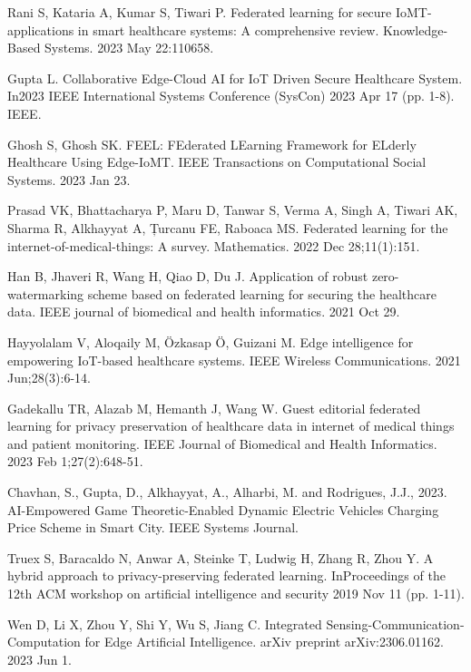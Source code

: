\documentclass[conference]{IEEEtran}
\begin{document}
\begin{thebibliography}{1}
Rani S, Kataria A, Kumar S, Tiwari P. Federated learning for secure IoMT-applications in smart healthcare systems: A comprehensive review. Knowledge-Based Systems. 2023 May 22:110658.

Gupta L. Collaborative Edge-Cloud AI for IoT Driven Secure Healthcare System. In2023 IEEE International Systems Conference (SysCon) 2023 Apr 17 (pp. 1-8). IEEE.

Ghosh S, Ghosh SK. FEEL: FEderated LEarning Framework for ELderly Healthcare Using Edge-IoMT. IEEE Transactions on Computational Social Systems. 2023 Jan 23.

Prasad VK, Bhattacharya P, Maru D, Tanwar S, Verma A, Singh A, Tiwari AK, Sharma R, Alkhayyat A, Țurcanu FE, Raboaca MS. Federated learning for the internet-of-medical-things: A survey. Mathematics. 2022 Dec 28;11(1):151.

Han B, Jhaveri R, Wang H, Qiao D, Du J. Application of robust zero-watermarking scheme based on federated learning for securing the healthcare data. IEEE journal of biomedical and health informatics. 2021 Oct 29.

Hayyolalam V, Aloqaily M, Özkasap Ö, Guizani M. Edge intelligence for empowering IoT-based healthcare systems. IEEE Wireless Communications. 2021 Jun;28(3):6-14.

Gadekallu TR, Alazab M, Hemanth J, Wang W. Guest editorial federated learning for privacy preservation of healthcare data in internet of medical things and patient monitoring. IEEE Journal of Biomedical and Health Informatics. 2023 Feb 1;27(2):648-51.

 Chavhan, S., Gupta, D., Alkhayyat, A., Alharbi, M. and Rodrigues, J.J., 2023. AI-Empowered Game Theoretic-Enabled Dynamic Electric Vehicles Charging Price Scheme in Smart City. IEEE Systems Journal.

Truex S, Baracaldo N, Anwar A, Steinke T, Ludwig H, Zhang R, Zhou Y. A hybrid approach to privacy-preserving federated learning. InProceedings of the 12th ACM workshop on artificial intelligence and security 2019 Nov 11 (pp. 1-11).

Wen D, Li X, Zhou Y, Shi Y, Wu S, Jiang C. Integrated Sensing-Communication-Computation for Edge Artificial Intelligence. arXiv preprint arXiv:2306.01162. 2023 Jun 1.
\end{thebibliography}
\end{document}
